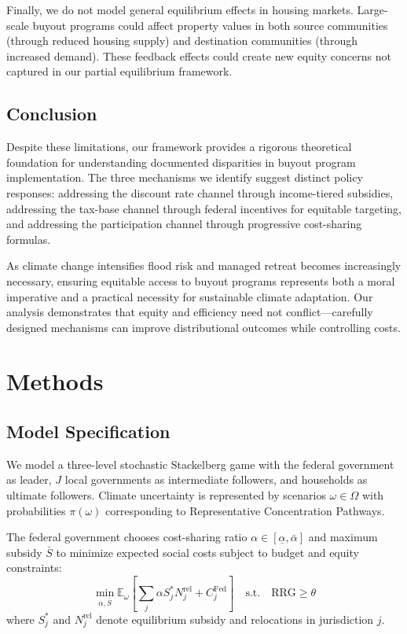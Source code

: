 \documentclass[11pt,letterpaper]{article}
\theoremstyle{definition}
\newcommand{\E}{\mathbb{E}}
\begin{document}
Finally, we do not model general equilibrium effects in housing markets. Large-scale buyout programs could affect property values in both source communities (through reduced housing supply) and destination communities (through increased demand). These feedback effects could create new equity concerns not captured in our partial equilibrium framework.

\subsection{Conclusion}

Despite these limitations, our framework provides a rigorous theoretical foundation for understanding documented disparities in buyout program implementation. The three mechanisms we identify suggest distinct policy responses: addressing the discount rate channel through income-tiered subsidies, addressing the tax-base channel through federal incentives for equitable targeting, and addressing the participation channel through progressive cost-sharing formulas.

As climate change intensifies flood risk and managed retreat becomes increasingly necessary, ensuring equitable access to buyout programs represents both a moral imperative and a practical necessity for sustainable climate adaptation. Our analysis demonstrates that equity and efficiency need not conflict---carefully designed mechanisms can improve distributional outcomes while controlling costs.

\section{Methods}
\label{sec:methods}

\subsection{Model Specification}

We model a three-level stochastic Stackelberg game with the federal government as leader, $J$ local governments as intermediate followers, and households as ultimate followers. Climate uncertainty is represented by scenarios $\omega \in \Omega$ with probabilities $\pi(\omega)$ corresponding to Representative Concentration Pathways.

The federal government chooses cost-sharing ratio $\alpha \in [\underline{\alpha}, \bar{\alpha}]$ and maximum subsidy $\bar{S}$ to minimize expected social costs subject to budget and equity constraints:
\begin{equation}
\min_{\alpha, \bar{S}} \E_\omega\left[\sum_{j} \alpha S_j^* N_j^{\text{rel}} + C_j^{\text{Fed}}\right] \quad \text{s.t.} \quad \text{RRG} \geq \theta
\end{equation}
where $S_j^*$ and $N_j^{\text{rel}}$ denote equilibrium subsidy and relocations in jurisdiction $j$.
\end{document}
